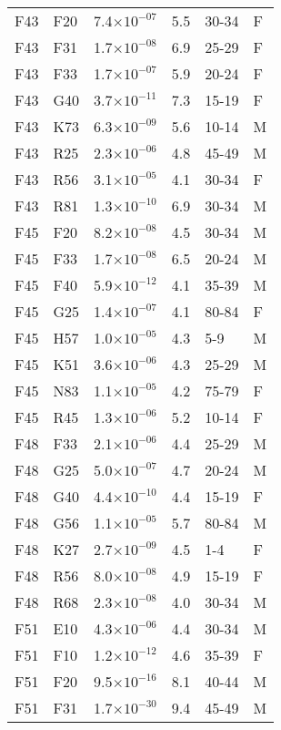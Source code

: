 \begin{longtable}{lllrll}
   F43 & F20 & 7.4$\times10^{-07}$ & 5.5 & 30-34 & F \\ 
   F43 & F31 & 1.7$\times10^{-08}$ & 6.9 & 25-29 & F \\ 
   F43 & F33 & 1.7$\times10^{-07}$ & 5.9 & 20-24 & F \\ 
   F43 & G40 & 3.7$\times10^{-11}$ & 7.3 & 15-19 & F \\ 
   F43 & K73 & 6.3$\times10^{-09}$ & 5.6 & 10-14 & M \\ 
   F43 & R25 & 2.3$\times10^{-06}$ & 4.8 & 45-49 & M \\ 
   F43 & R56 & 3.1$\times10^{-05}$ & 4.1 & 30-34 & F \\ 
   F43 & R81 & 1.3$\times10^{-10}$ & 6.9 & 30-34 & M \\ 
   F45 & F20 & 8.2$\times10^{-08}$ & 4.5 & 30-34 & M \\ 
   F45 & F33 & 1.7$\times10^{-08}$ & 6.5 & 20-24 & M \\ 
   F45 & F40 & 5.9$\times10^{-12}$ & 4.1 & 35-39 & M \\ 
   F45 & G25 & 1.4$\times10^{-07}$ & 4.1 & 80-84 & F \\ 
   F45 & H57 & 1.0$\times10^{-05}$ & 4.3 & 5-9 & M \\ 
   F45 & K51 & 3.6$\times10^{-06}$ & 4.3 & 25-29 & M \\ 
   F45 & N83 & 1.1$\times10^{-05}$ & 4.2 & 75-79 & F \\ 
   F45 & R45 & 1.3$\times10^{-06}$ & 5.2 & 10-14 & F \\ 
   F48 & F33 & 2.1$\times10^{-06}$ & 4.4 & 25-29 & M \\ 
   F48 & G25 & 5.0$\times10^{-07}$ & 4.7 & 20-24 & M \\ 
   F48 & G40 & 4.4$\times10^{-10}$ & 4.4 & 15-19 & F \\ 
   F48 & G56 & 1.1$\times10^{-05}$ & 5.7 & 80-84 & M \\ 
   F48 & K27 & 2.7$\times10^{-09}$ & 4.5 & 1-4 & F \\ 
   F48 & R56 & 8.0$\times10^{-08}$ & 4.9 & 15-19 & F \\ 
   F48 & R68 & 2.3$\times10^{-08}$ & 4.0 & 30-34 & M \\ 
   F51 & E10 & 4.3$\times10^{-06}$ & 4.4 & 30-34 & M \\ 
   F51 & F10 & 1.2$\times10^{-12}$ & 4.6 & 35-39 & F \\ 
   F51 & F20 & 9.5$\times10^{-16}$ & 8.1 & 40-44 & M \\ 
   F51 & F31 & 1.7$\times10^{-30}$ & 9.4 & 45-49 & M \\ 

\end{longtable}
